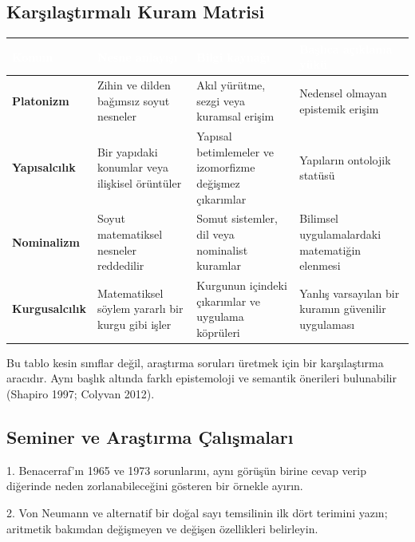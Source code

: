 \subsection{Karşılaştırmalı Kuram Matrisi}

\par\smallskip\begin{center}{\renewcommand{\arraystretch}{1.25}\footnotesize\begin{tabularx}{\linewidth}{|>{\raggedright\arraybackslash}p{2.10cm}|Y|Y|Y|}\hline
{}\textcolor{white}{\bfseries Konum} & \textcolor{white}{\bfseries Nesne anlayışı} & \textcolor{white}{\bfseries Bilgi kaynağı} & \textcolor{white}{\bfseries Başlıca açıklama yükü} \\ \hline
\textbf{Platonizm} & Zihin ve dilden bağımsız soyut nesneler & Akıl yürütme, sezgi veya kuramsal erişim & Nedensel olmayan epistemik erişim \\ \hline
\textbf{Yapısalcılık} & Bir yapıdaki konumlar veya ilişkisel örüntüler & Yapısal betimlemeler ve izomorfizme değişmez çıkarımlar & Yapıların ontolojik statüsü \\ \hline
\textbf{Nominalizm} & Soyut matematiksel nesneler reddedilir & Somut sistemler, dil veya nominalist kuramlar & Bilimsel uygulamalardaki matematiğin elenmesi \\ \hline
\textbf{Kurgusalcılık} & Matematiksel söylem yararlı bir kurgu gibi işler & Kurgunun içindeki çıkarımlar ve uygulama köprüleri & Yanlış varsayılan bir kuramın güvenilir uygulaması \\ \hline
\end{tabularx}}\end{center}\par\smallskip

Bu tablo kesin sınıflar değil, araştırma soruları üretmek için bir karşılaştırma aracıdır. Aynı başlık altında farklı epistemoloji ve semantik önerileri bulunabilir (Shapiro 1997; Colyvan 2012).

\subsection{Seminer ve Araştırma Çalışmaları}
1. Benacerraf’ın 1965 ve 1973 sorunlarını, aynı görüşün birine cevap verip diğerinde neden zorlanabileceğini gösteren bir örnekle ayırın.

2. Von Neumann ve alternatif bir doğal sayı temsilinin ilk dört terimini yazın; aritmetik bakımdan değişmeyen ve değişen özellikleri belirleyin.


